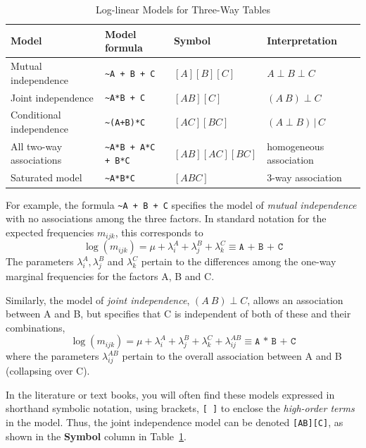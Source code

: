 \documentclass[10pt,twoside]{article}\usepackage[]{graphicx}\usepackage[]{color}
\newcommand*{\given}{\ensuremath{\, | \,}}
\newenvironment{equation*}{\displaymath}{\enddisplaymath}%
\newcommand{\tabref}[1]{Table~\ref{#1}}
\begin{document}
\begin{table}[htb]
 \caption{Log-linear Models for Three-Way Tables}\label{tab:loglin-3way}
 \begin{center}
 \begin{tabular}{llll}
  \hline
  \textbf{Model}           & \textbf{Model formula}  & \textbf{Symbol}& \textbf{Interpretation} \\
  \hline\hline 
  Mutual independence      & \verb|~A + B + C|       & $[A][B][C]$    & $A \perp B \perp C$ \\ 
  Joint independence       & \verb|~A*B + C|         & $[AB][C]$      & $(A \: B) \perp C$ \\ 
  Conditional independence & \verb|~(A+B)*C|         & $[AC][BC]$     & $(A \perp B) \given C$ \\ 
  All two-way associations & \verb|~A*B + A*C + B*C| & $[AB][AC][BC]$ & homogeneous association  \\ 
  Saturated model          & \verb|~A*B*C|           & $[ABC]$        & 3-way association \\ 
  \hline
 \end{tabular}
 \end{center}
\end{table}



For example, the formula \verb|~A + B + C| specifies the model of \emph{mutual independence} with
no associations among the three factors.  In standard notation for the expected frequencies
$m_{ijk}$, this corresponds to
\begin{equation*}
	\log ( m_{ijk} ) = \mu + \lambda_i^A + \lambda_j^B + \lambda_k^C \equiv \texttt{A + B + C}
\end{equation*}
The parameters $\lambda_i^A , \lambda_j^B$ and  $\lambda_k^C$ pertain to the differences among the
one-way marginal frequencies for the factors A, B and C. 

Similarly, the model of \emph{joint independence},  $(A \: B) \perp C$,
allows an association between A and B, but specifies that
C is independent of both of these and their combinations,
\begin{equation*}
	\log ( m_{ijk} ) = \mu + \lambda_i^A + \lambda_j^B + \lambda_k^C + \lambda_{ij}^{AB} \equiv \texttt{A * B + C}
\end{equation*}
where the parameters $\lambda_{ij}^{AB}$ pertain to the overall association between A and B (collapsing over C).

In the literature or text books, you will often find these models expressed in shorthand symbolic notation,
using brackets, \texttt{[ ]} to enclose the \emph{high-order terms} in the model.
Thus, the joint independence model can be denoted \texttt{[AB][C]}, as shown in the \textbf{Symbol} column in 
\tabref{tab:loglin-3way}.
\end{document}
